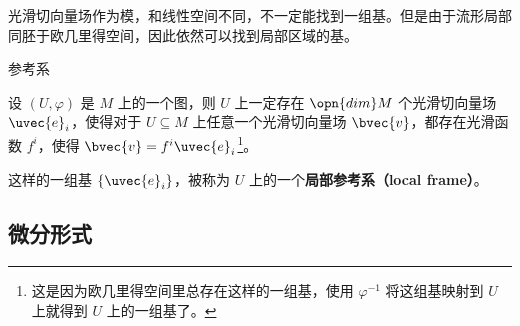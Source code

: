 光滑切向量场作为模，和线性空间不同，不一定能找到一组基。但是由于流形局部同胚于欧几里得空间，因此依然可以找到局部区域的基。


\begin{definition}{参考系}

设 $(U, \varphi)$ 是 $M$ 上的一个图，则 $U$ 上一定存在 $\opn{dim}M$ 个光滑切向量场 $\uvec{e}_i$，使得对于 $U\subseteq M$ 上任意一个光滑切向量场 $\bvec{v}$，都存在光滑函数 $f^i$，使得 $\bvec{v}=f^i\uvec{e}_i$\footnote{这是因为欧几里得空间里总存在这样的一组基，使用 $\varphi^{-1}$ 将这组基映射到 $U$ 上就得到 $U$ 上的一组基了。}。

这样的一组基 $\{\uvec{e}_i\}$，被称为 $U$ 上的一个\textbf{局部参考系（local frame）}。

\end{definition}



\subsection{微分形式}








